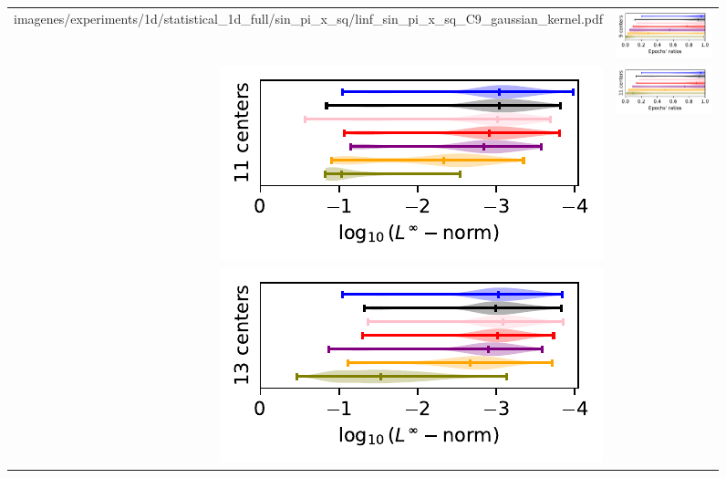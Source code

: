 \documentclass[12pt]{report} %
\begin{document}
\begin{figure}[H]
\begin{tabular}{rl}
{    {imagenes/experiments/1d/statistical_1d_full/sin_pi_x_sq/linf_sin_pi_x_sq_C9_gaussian_kernel.pdf}}  & 
    {\includegraphics[width=.44\textwidth, trim={.7cm 1.15cm 0 0},clip=true]
        {imagenes/experiments/1d/statistical_1d_full/sin_pi_x_sq/epochs_sin_pi_x_sq_C9_gaussian_kernel.pdf}}
    \\
    {\includegraphics[width=.5\textwidth, trim={0 1.25cm 0 0},clip=true]
    {imagenes/experiments/1d/statistical_1d_full/sin_pi_x_sq/linf_sin_pi_x_sq_C11_gaussian_kernel.pdf}} & 
    {\includegraphics[width=.44\textwidth, trim={.7cm 1.15cm 0 0},clip=true]
    {imagenes/experiments/1d/statistical_1d_full/sin_pi_x_sq/epochs_sin_pi_x_sq_C11_gaussian_kernel.pdf}}                                                                                     \\
    {\includegraphics[width=.5\textwidth, trim={0 1.25cm 0 0},clip=true]
    {imagenes/experiments/1d/statistical_1d_full/sin_pi_x_sq/linf_sin_pi_x_sq_C13_gaussian_kernel.pdf}} & 
    {\includegraphics[width=.44\textwidth, trim={.7cm 1.15cm 0 0},clip=true]
}
\end{tabular}
\end{figure}
\end{document}
